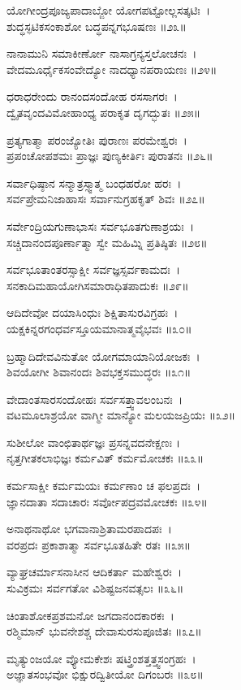 	ಯೋಗೀಂದ್ರಪೂಜ್ಯಪಾದಾಬ್ಜೋ ಯೋಗಪಟ್ಟೋಲ್ಲಸತ್ಕಟಿಃ~।\\
	ಶುದ್ಧಸ್ಫಟಿಕಸಂಕಾಶೋ ಬದ್ಧಪನ್ನಗಭೂಷಣಃ ॥೨೩॥

ನಾನಾಮುನಿ ಸಮಾಕೀರ್ಣೋ ನಾಸಾಗ್ರನ್ಯಸ್ತಲೋಚನಃ~।\\
ವೇದಮೂರ್ಧೈಕಸಂವೇದ್ಯೋ ನಾದಧ್ಯಾನಪರಾಯಣಃ ॥೨೪॥

	ಧರಾಧರೇಂದು ರಾನಂದಸಂದೋಹ ರಸಸಾಗರಃ~।\\
	ದ್ವೈತವೃಂದವಿಮೋಹಾಂಧ್ಯ ಪರಾಕೃತ ದೃಗದ್ಭುತಃ ॥೨೫॥

ಪ್ರತ್ಯಗಾತ್ಮಾ ಪರಂಜ್ಯೋತಿಃ ಪುರಾಣಃ ಪರಮೇಶ್ವರಃ~।\\
ಪ್ರಪಂಚೋಪಶಮಃ ಪ್ರಾಜ್ಞಃ ಪುಣ್ಯಕೀರ್ತಿಃ ಪುರಾತನಃ ॥೨೬॥

	ಸರ್ವಾಧಿಷ್ಠಾನ ಸನ್ಮಾತ್ರಸ್ಸ್ವಾತ್ಮ ಬಂಧಹರೋ ಹರಃ~।\\
	ಸರ್ವಪ್ರೇಮನಿಜಾಹಾಸಃ ಸರ್ವಾನುಗ್ರಹಕೃತ್ ಶಿವಃ ॥೨೭॥

ಸರ್ವೇಂದ್ರಿಯಗುಣಾಭಾಸಃ ಸರ್ವಭೂತಗುಣಾಶ್ರಯಃ~।\\
ಸಚ್ಚಿದಾನಂದಪೂರ್ಣಾತ್ಮಾ ಸ್ವೇ ಮಹಿಮ್ನಿ ಪ್ರತಿಷ್ಠಿತಃ ॥೨೮॥

	ಸರ್ವಭೂತಾಂತರಸ್ಸಾಕ್ಷೀ ಸರ್ವಜ್ಞಸ್ಸರ್ವಕಾಮದಃ~।\\
	ಸನಕಾದಿಮಹಾಯೋಗಿಸಮಾರಾಧಿತಪಾದುಕಃ ॥೨೯॥

ಆದಿದೇವೋ ದಯಾಸಿಂಧುಃ ಶಿಕ್ಷಿತಾಸುರವಿಗ್ರಹಃ~।\\
ಯಕ್ಷಕಿನ್ನರಗಂಧರ್ವಸ್ತೂಯಮಾನಾತ್ಮವೈಭವಃ ॥೩೦॥

	ಬ್ರಹ್ಮಾದಿದೇವವಿನುತೋ ಯೋಗಮಾಯಾನಿಯೋಜಕಃ~।\\
	ಶಿವಯೋಗೀ ಶಿವಾನಂದಃ ಶಿವಭಕ್ತಸಮುದ್ಧರಃ ॥೩೧॥

ವೇದಾಂತಸಾರಸಂದೋಹಃ ಸರ್ವಸತ್ತ್ವಾವಲಂಬನಃ~।\\
ವಟಮೂಲಾಶ್ರಯೋ ವಾಗ್ಮೀ ಮಾನ್ಯೋ ಮಲಯಜಪ್ರಿಯಃ ॥೩೨॥

	ಸುಶೀಲೋ ವಾಂಛಿತಾರ್ಥಜ್ಞಃ ಪ್ರಸನ್ನವದನೇಕ್ಷಣಃ ।\\
	ನೃತ್ತಗೀತಕಲಾಭಿಜ್ಞಃ ಕರ್ಮವಿತ್ ಕರ್ಮಮೋಚಕಃ ॥೩೩॥

ಕರ್ಮಸಾಕ್ಷೀ ಕರ್ಮಮಯಃ ಕರ್ಮಣಾಂ ಚ ಫಲಪ್ರದಃ~।\\
ಜ್ಞಾನದಾತಾ ಸದಾಚಾರಃ ಸರ್ವೋಪದ್ರವಮೋಚಕಃ ॥೩೪॥

	ಅನಾಥನಾಥೋ ಭಗವಾನಾಶ್ರಿತಾಮರಪಾದಪಃ~।\\
	ವರಪ್ರದಃ ಪ್ರಕಾಶಾತ್ಮಾ ಸರ್ವಭೂತಹಿತೇ ರತಃ ॥೩೫॥

ವ್ಯಾಘ್ರಚರ್ಮಾಸನಾಸೀನ ಆದಿಕರ್ತಾ ಮಹೇಶ್ವರಃ~।\\
ಸುವಿಕ್ರಮಃ ಸರ್ವಗತೋ ವಿಶಿಷ್ಟಜನವತ್ಸಲಃ ॥೩೬॥

	ಚಿಂತಾಶೋಕಪ್ರಶಮನೋ ಜಗದಾನಂದಕಾರಕಃ~।\\
	ರಶ್ಮಿಮಾನ್ ಭುವನೇಶಶ್ಚ ದೇವಾಸುರಸುಪೂಜಿತಃ ॥೩೭॥

ಮೃತ್ಯುಂಜಯೋ ವ್ಯೋಮಕೇಶಃ ಷಟ್ತ್ರಿಂಶತ್ತತ್ತ್ವಸಂಗ್ರಹಃ~।\\
ಅಜ್ಞಾತಸಂಭವೋ ಭಿಕ್ಷುರದ್ವಿತೀಯೋ ದಿಗಂಬರಃ ॥೩೮॥

